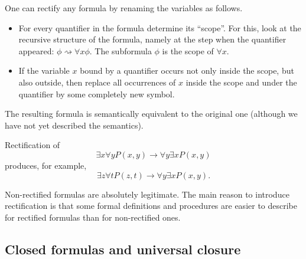 \begin{page}
\setcounter{section}{1}
\setcounter{subsection}{2}
\setcounter{dfn}{5}
\label{portion:501}


One can rectify any formula by renaming the variables as follows.
\begin{itemize}
\item
For every quantifier in the formula determine its ``scope''.
For this, look at the recursive structure of the formula,
namely at the step when the quantifier appeared: $\phi \rightsquigarrow \forall x \phi$.
The subformula $\phi$ is the scope of $\forall x$.
\item
If the variable $x$ bound by a quantifier occurs not only inside the scope,
but also outside, then replace all occurrences of $x$ inside the scope and under the quantifier by some completely new symbol.
\end{itemize}

The resulting formula is semantically equivalent to the original one (although we have not yet described the semantics).


\end{page}

\begin{page}
\setcounter{section}{1}
\setcounter{subsection}{2}
\setcounter{dfn}{6}
\label{portion:503}

\begin{exl}
Rectification of
\[
\exists x \forall y P(x,y) \to \forall y \exists x P(x,y)
\]
produces, for example,
\[
\exists z \forall t P(z,t) \to \forall y \exists x P(x,y).
\]
\end{exl}

\end{page}

\begin{page}
\setcounter{section}{1}
\setcounter{subsection}{2}
\setcounter{dfn}{7}
\label{portion:506}

\begin{rem}
Non-rectified formulas are absolutely legitimate.
The main reason to introduce rectification is that
some formal definitions and procedures are easier to describe for rectified formulas than for non-rectified ones.
\end{rem}

\end{page}

\begin{page}
\setcounter{section}{1}
\setcounter{subsection}{3}
\setcounter{dfn}{7}
\label{portion:508}

\subsection{Closed formulas and universal closure}

\end{page}

